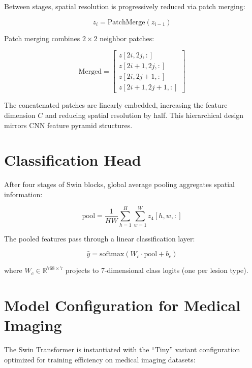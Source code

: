 Between stages, spatial resolution is progressively reduced via patch merging:

\begin{equation}
z_{i} = \text{PatchMerge}(z_{i-1})
\end{equation}

Patch merging combines $2 \times 2$ neighbor patches:

\begin{equation}
\text{Merged} = \left[\begin{array}{c}
z[2i, 2j, :] \\
z[2i+1, 2j, :] \\
z[2i, 2j+1, :] \\
z[2i+1, 2j+1, :]
\end{array}\right]
\end{equation}

The concatenated patches are linearly embedded, increasing the feature dimension $C$ and reducing spatial resolution by half. This hierarchical design mirrors CNN feature pyramid structures.

\section{Classification Head}

After four stages of Swin blocks, global average pooling aggregates spatial information:

\begin{equation}
\text{pool} = \frac{1}{HW}\sum_{h=1}^{H}\sum_{w=1}^{W} z_{4}[h, w, :]
\end{equation}

The pooled features pass through a linear classification layer:

\begin{equation}
\hat{y} = \text{softmax}(W_c \cdot \text{pool} + b_c)
\end{equation}

where $W_c \in \mathbb{R}^{768 \times 7}$ projects to 7-dimensional class logits (one per lesion type).

\section{Model Configuration for Medical Imaging}

The Swin Transformer is instantiated with the ``Tiny'' variant configuration optimized for training efficiency on medical imaging datasets:

